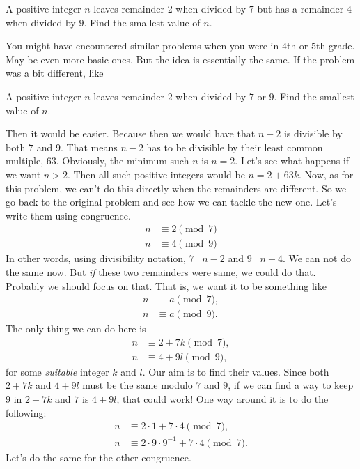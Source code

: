 \documentclass{subfile}
\begin{document}
	\begin{problem}
		A positive integer $n$ leaves remainder $2$ when divided by $7$ but has a remainder $4$ when divided by $9$. Find the smallest value of $n$.
	\end{problem}
	You might have encountered similar problems when you were in $4$th or $5$th grade. May be even more basic ones. But the idea is essentially the same. If the problem was a bit different, like
	\begin{problem}
		A positive integer $n$ leaves remainder $2$ when divided by $7$ or $9$. Find the smallest value of $n$.
	\end{problem}
	Then it would be easier. Because then we would have that $n-2$ is
	divisible by both $7$ and $9$. That means $n-2$ has to be divisible by their least common multiple, $63$. Obviously, the minimum such $n$ is $n=2$. Let's see what happens if we want $n>2$. Then all such positive integers would be $n=2+63k$. Now, as for this problem, we can't do this directly when the remainders are different. So we go back to the original problem and see how we can tackle the new one. Let's write them using congruence.
	\begin{align*}
		n & \equiv2\pmod{7}\\
		n & \equiv4\pmod{9}
	\end{align*}
	In other words, using divisibility notation, $7\mid n-2$ and $9\mid n-4$. We can not do the same now. But \textit{if} these two remainders were same, we could do that. Probably we should focus on that. That is, we want it to be something like
		\begin{align*}
			n & \equiv a\pmod 7,\\
			n & \equiv a\pmod 9.
		\end{align*}
	The only thing we can do here is
		\begin{align*}
			n & \equiv2+7k\pmod7,\\
			n & \equiv4+9l\pmod9,
		\end{align*}
	for some \textit{suitable} integer $k$ and $l$. Our aim is to find their values. Since both $2+7k$ and $4+9l$ must be the same modulo $7$ and $9$, if we can find a way to keep $9$ in $2+7k$ and $7$ is $4+9l$, that could work! One way around it is to do the following:
		\begin{align*}
			n & \equiv2\cdot1+7\cdot4\pmod7,\\
			n & \equiv2\cdot9\cdot9^{-1}+7\cdot4\pmod{7}.
		\end{align*}
	Let's do the same for the other congruence.
\end{document}
